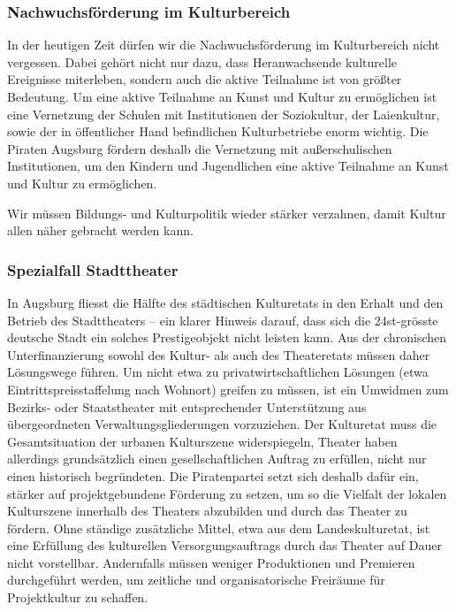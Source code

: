 \documentclass[a5paper, ngerman, 10pt]{scrbook}
\begin{document}
   \subsubsection{Nachwuchsförderung im Kulturbereich}
   
   In der heutigen Zeit dürfen wir die Nachwuchsförderung im Kulturbereich 
   nicht vergessen. Dabei gehört nicht nur dazu, dass Heranwachsende 
   kulturelle Ereignisse miterleben, sondern auch die aktive Teilnahme ist von 
   größter Bedeutung. Um eine aktive Teilnahme an Kunst und Kultur zu 
   ermöglichen ist eine Vernetzung der Schulen mit Institutionen der 
   Soziokultur, der Laienkultur, sowie der in öffentlicher Hand befindlichen 
   Kulturbetriebe enorm wichtig. Die Piraten Augsburg fördern deshalb die 
   Vernetzung mit außerschulischen Institutionen, um den Kindern und 
   Jugendlichen eine aktive Teilnahme an Kunst und Kultur zu ermöglichen.
   
   Wir müssen Bildungs- und Kulturpolitik wieder stärker verzahnen, damit 
   Kultur allen näher gebracht werden kann.
   
   \subsubsection{Spezialfall Stadttheater}
   
   In Augsburg fliesst die Hälfte des städtischen Kulturetats in den Erhalt 
   und den Betrieb des Stadttheaters – ein klarer Hinweis darauf, dass sich 
   die 24st-grösste deutsche Stadt ein solches Prestigeobjekt nicht leisten 
   kann. Aus der chronischen Unterfinanzierung sowohl des Kultur- als auch des 
   Theateretats müssen daher Lösungswege führen. Um nicht etwa zu 
   privatwirtschaftlichen Lösungen (etwa Eintrittspreisstaffelung nach 
   Wohnort) greifen zu müssen, ist ein Umwidmen zum Bezirks- oder 
   Staatstheater mit entsprechender Unterstützung aus übergeordneten 
   Verwaltungsgliederungen vorzuziehen. Der Kulturetat muss die 
   Gesamtsituation der urbanen Kulturszene widerspiegeln, Theater haben 
   allerdings grundsätzlich einen gesellschaftlichen Auftrag zu erfüllen, 
   nicht nur einen historisch begründeten. Die Piratenpartei setzt sich 
   deshalb dafür ein, stärker auf projektgebundene Förderung zu setzen, um so 
   die Vielfalt der lokalen Kulturszene innerhalb des Theaters abzubilden und 
   durch das Theater zu fördern. Ohne ständige zusätzliche Mittel, etwa aus 
   dem Landeskulturetat, ist eine Erfüllung des kulturellen 
   Versorgungsauftrags durch das Theater auf Dauer nicht vorstellbar. 
   Andernfalls müssen weniger Produktionen und Premieren durchgeführt werden, 
   um zeitliche und organisatorische Freiräume für Projektkultur zu schaffen.
   
\end{document}
